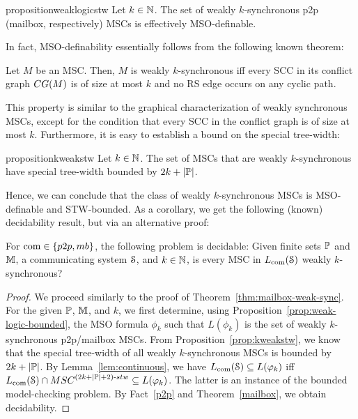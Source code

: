 \documentclass[a4paper,UKenglish,cleveref, autoref, thm-restate]{lipics-v2021}
\begin{document}
\medskip


\begin{restatable}{proposition}{weaklogicstw}
	\label{prop:weak-logic-bounded}
	Let $k \in \mathbb{N}$. The set of weakly $k$-synchronous p2p (mailbox, respectively) MSCs
	is effectively MSO-definable.
\end{restatable}


In fact, MSO-definability essentially follows from the following known theorem:

\begin{theorem} \label{th:scccharactweak}
	Let $M$ be an MSC. Then, $M$ is weakly $k$-synchronous iff every SCC in its conflict graph
	$\cgraph{\msc}$ is of size at most $k$ and no RS edge occurs on any cyclic path.
\end{theorem}

This property is similar to the graphical characterization of weakly synchronous MSCs, except  for the condition that every SCC in the conflict graph is of size at most $k$.
Furthermore, it is easy to establish a bound on the special tree-width:

\begin{restatable}{proposition}{kweakstw}
\label{prop:kweakstw}
	Let $k \in \mathbb{N}$. The set of MSCs that are weakly $k$-synchronous have special tree-width bounded by $2k+|\mathbb{P}|$.
\end{restatable}

Hence, we can conclude that the class of weakly $k$-synchronous MSCs is MSO-definable and STW-bounded.
As a corollary, we get the following (known) decidability result, but via an alternative proof:

\begin{theorem}\label{thm:weak-sync}
For $\comsymb \in \{\ppsymb, \mbsymb\}$, the following problem is decidable:
Given finite sets $\mathbb{P}$ and $\mathbb{M}$, a communicating system $\mathcal{S}$, and $k \in \mathbb{N}$,
is every MSC in $L_{\textup{com}}(\mathcal{S})$ weakly $k$-synchronous?
\end{theorem}


\begin{proof}
We proceed similarly to the proof of Theorem~\ref{thm:mailbox-weak-sync}.
%
For the given $\mathbb{P}$, $\mathbb{M}$, and $k$, we first determine,
using Proposition~\ref{prop:weak-logic-bounded}, the MSO formula $\phi_k$ such
that $L(\phi_k)$ is the set of weakly $k$-synchronous p2p/mailbox MSCs. From
Proposition~\ref{prop:kweakstw}, we know that
the special tree-width of all weakly $k$-synchronous MSCs is bounded by
$2k + |\mathbb{P}|$.
%
By Lemma~\ref{lem:continuous}, we have
$L_{\textup{com}}(\mathcal{S}) \subseteq L(\varphi_k)$ iff
$\cL{\System} \cap \stwMSCs{(2k + |\Procs| + 2)} \subseteq L(\phi_k)$.
The latter is an instance of the bounded model-checking problem.
By Fact~\ref{p2p} and Theorem~\ref{mailbox}, we obtain decidability.
\end{proof}
\end{document}
